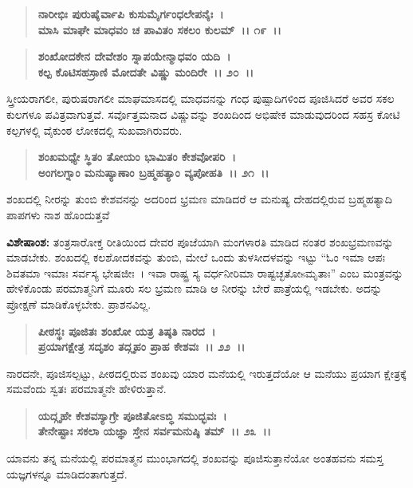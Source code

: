 \begin{verse}
\textbf{ನಾರೀಭಿಃ ಪುರುಷೈರ್ವಾಪಿ ಕುಸುಮೈರ್ಗಂಧಲೇಪನೈಃ~।}\\\textbf{ಮಾಸಿ ಮಾಘೇ ಮಾಧವಂ ಚ ಪಾವಿತಂ ಸಕಲಂ ಕುಲಮ್~।। ೧೯~।। }
\end{verse}

\begin{verse}
\textbf{ಶಂಖೋದಕೇನ ದೇವೇಶಂ ಸ್ನಾಪಯೇನ್ಮಾಧವಂ ಯದಿ~।}\\\textbf{ಕಲ್ಪ ಕೊಟಿಸಹಸ್ರಾಣಿ ಮೋದತೇ ವಿಷ್ಣು ಮಂದಿರೇ~।। ೨೦~।।}
\end{verse}

ಸ್ತ್ರೀಯರಾಗಲೀ, ಪುರುಷರಾಗಲೀ ಮಾಘಮಾಸದಲ್ಲಿ ಮಾಧವನನ್ನು ಗಂಧ ಪುಷ್ಪಾದಿಗಳಿಂದ ಪೂಜಿಸಿದರೆ ಅವರ ಸಕಲ ಕುಲಗಳೂ ಪವಿತ್ರವಾಗುತ್ತವೆ. ಸರ್ವೊತ್ತಮನಾದ ವಿಷ್ಣುವನ್ನು ಶಂಖದಿಂದ ಅಭಿಷೇಕ ಮಾಡುವುದರಿಂದ ಸಹಸ್ರ ಕೋಟಿ ಕಲ್ಪಗಳಲ್ಲಿ ವೈಕುಂಠ ಲೋಕದಲ್ಲಿ ಸುಖವಾಗಿರುವರು.

\begin{verse}
\textbf{ಶಂಖಮಧ್ಯೇ ಸ್ಥಿತಂ ತೋಯಂ ಭಾಮಿತಂ ಕೇಶವೋಪರಿ~।}\\\textbf{ಅಂಗಲಗ್ನಾಂ ಮನುಷ್ಯಾಣಾಂ ಬ್ರಹ್ಮಹತ್ಯಾಂ ವ್ಯಪೋಹತಿ~।। ೨೧~।।}
\end{verse}

ಶಂಖದಲ್ಲಿ ನೀರನ್ನು ತುಂಬಿ ಕೇಶವನನ್ನು ಅದರಿಂದ ಭ್ರಮಣ ಮಾಡಿದರೆ ಆ ಮನುಷ್ಯ ದೇಹದಲ್ಲಿರುವ ಬ್ರಹ್ಮಹತ್ಯಾದಿ ಪಾಪಗಳು ನಾಶ ಹೊಂದುತ್ತವೆ

\begin{myquote}
\textbf{ವಿಶೇಷಾಂಶ:} ತಂತ್ರಸಾರೋಕ್ತ ರೀತಿಯಿಂದ ದೇವರ ಪೂಜೆಯಾಗಿ ಮಂಗಳಾರತಿ ಮಾಡಿದ ನಂತರ ಶಂಖಭ್ರಮಣವನ್ನು ಮಾಡಬೇಕು. ಶಂಖದಲ್ಲಿ ಕಲಶೋದಕವನ್ನು ತುಂಬಿ, ಮೇಲೆ ಒಂದು ತುಳಸೀದಳವನ್ನು ಇಟ್ಟು “ಓಂ ಇಮಾ ಆಪಃ ಶಿವತಮಾ ಇಮಾಃ ಸರ್ವಸ್ಯ ಭೇಷಜೀಃ~। ಇವಾ ರಾಷ್ಟ್ರ ಸ್ಯ ವರ್ಧನೀರಿಮಾ ರಾಷ್ಟಚ್ಛತೋsಮೃತಾಃ” ಎಂಬ ಮಂತ್ರವನ್ನು ಹೇಳಿಕೊಂಡು ಪರಮಾತ್ಮನಿಗೆ ಮೂರು ಸಲ ಭ್ರಮಣ ಮಾಡಿ ಆ ನೀರನ್ನು ಬೇರೆ ಪಾತ್ರೆಯಲ್ಲಿ ಇಡಬೇಕು. ಅದನ್ನು ಪ್ರೋಕ್ಷಣೆ ಮಾಡಿಕೊಳ್ಳಬೇಕು. ಪ್ರಾಶನವಿಲ್ಲ.
\end{myquote}

\begin{verse}
\textbf{ಪೀಠಸ್ಥಃ ಪೂಜಿತಃ ಶಂಖೋ ಯತ್ರ ತಿಷ್ಠತಿ ನಾರದ~।}\\\textbf{ಪ್ರಯಾಗಕ್ಷೇತ್ರ ಸದೃಶಂ ತದ್ಗೃಹಂ ಪ್ರಾಹ ಕೇಶವಃ~।। ೨೨~।।}
\end{verse}

ನಾರದನೇ, ಪೂಜಿಸಲ್ಪಟ್ಟು, ಪೀಠದಲ್ಲಿರುವ ಶಂಖವು ಯಾರ ಮನೆಯಲ್ಲಿ ಇರುತ್ತದೆಯೋ ಆ ಮನೆಯು ಪ್ರಯಾಗ ಕ್ಷೇತ್ರಕ್ಕೆ ಸಮವೆಂದು ಸ್ವತಃ ಪರಮಾತ್ಮನೇ ಹೇಳಿರುತ್ತಾನೆ.

\begin{verse}
\textbf{ಯದ್ಗೃಹೇ ಕೇಶವಸ್ಯಾಗ್ರೇ ಪೂಜಿತೋಽಬ್ಧಿ ಸಮುದ್ಭವಃ~।}\\\textbf{ತೇನೇಷ್ಟಾಃ ಸಕಲಾ ಯಜ್ಞಾ ಸ್ತೇನ ಸರ್ವಮನುಷ್ಠಿ ತಮ್~।। ೨೩~।।}
\end{verse}

ಯಾವನು ತನ್ನ ಮನೆಯಲ್ಲಿ ಪರಮಾತ್ಮನ ಮುಂಭಾಗದಲ್ಲಿ ಶಂಖವನ್ನು ಪೂಜಿಸುತ್ತಾನೆಯೋ ಅಂತಹವನು ಸಮಸ್ತ ಯಜ್ಞಗಳನ್ನೂ ಮಾಡಿದಂತಾಗುತ್ತದೆ.

